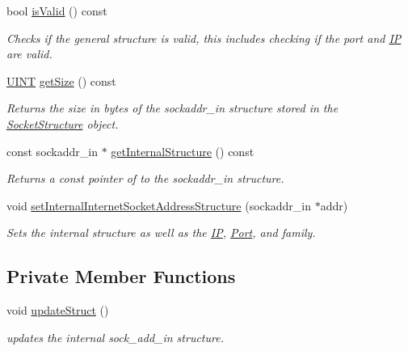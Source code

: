 \begin{DoxyCompactItemize}
bool \hyperlink{class_communication_1_1_socket_structure_add4c226e6a517cd50505b9d80b74ab72}{is\+Valid} () const 
\begin{DoxyCompactList}\small\item\em Checks if the general structure is valid, this includes checking if the port and \hyperlink{class_communication_1_1_i_p}{I\+P} are valid. \end{DoxyCompactList}\item 
\hyperlink{typedefs_8h_a2e2c38961834f28c06e17e074eb00bc7}{U\+I\+N\+T} \hyperlink{class_communication_1_1_socket_structure_a3d80b5598e8fbc5ada0838a4c8d622fc}{get\+Size} () const 
\begin{DoxyCompactList}\small\item\em Returns the size in bytes of the sockaddr\+\_\+in structure stored in the \hyperlink{class_communication_1_1_socket_structure}{Socket\+Structure} object. \end{DoxyCompactList}\item 
const sockaddr\+\_\+in $\ast$ \hyperlink{class_communication_1_1_socket_structure_a976af3d3e1ea120ba80b4e808a9600b9}{get\+Internal\+Structure} () const 
\begin{DoxyCompactList}\small\item\em Returns a const pointer of to the sockaddr\+\_\+in structure. \end{DoxyCompactList}\item 
void \hyperlink{class_communication_1_1_socket_structure_afb9a6f6cdae0ebba5aea50e2fe7ec1a5}{set\+Internal\+Internet\+Socket\+Address\+Structure} (sockaddr\+\_\+in $\ast$addr)
\begin{DoxyCompactList}\small\item\em Sets the internal structure as well as the \hyperlink{class_communication_1_1_i_p}{I\+P}, \hyperlink{class_communication_1_1_port}{Port}, and family. \end{DoxyCompactList}\end{DoxyCompactItemize}
\subsection*{Private Member Functions}
\begin{DoxyCompactItemize}
\item 
void \hyperlink{class_communication_1_1_socket_structure_ae82ee7be05b9ee39e8c540d127389251}{update\+Struct} ()
\begin{DoxyCompactList}\small\item\em updates the internal sock\+\_\+add\+\_\+in structure. \end{DoxyCompactList}\end{DoxyCompactItemize}
